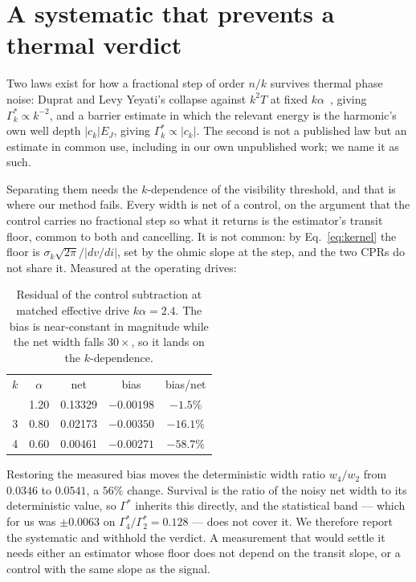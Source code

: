 \documentclass[aps,prb,twocolumn,superscriptaddress,floatfix,nofootinbib]{revtex4-2}
\begin{document}
\section{A systematic that prevents a thermal verdict}
\label{sec:thermal}

Two laws exist for how a fractional step of order $n/k$ survives thermal phase
noise: Duprat and Levy Yeyati's collapse against $k^2T$ at fixed
$k\alpha$~\cite{Duprat2005}, giving $\Gamma^*_k\propto k^{-2}$, and a barrier
estimate in which the relevant energy is the harmonic's own well depth
$|c_k|E_J$, giving $\Gamma^*_k\propto|c_k|$. The second is not a published law
but an estimate in common use, including in our own unpublished work; we name it
as such.

Separating them needs the $k$-dependence of the visibility threshold, and that
is where our method fails. Every width is net of a control, on the argument that
the control carries no fractional step so what it returns is the estimator's
transit floor, common to both and cancelling. It is not common: by
Eq.~\eqref{eq:kernel} the floor is $\sigma_k\sqrt{2\pi}/|dv/di|$, set by the
ohmic slope at the step, and the two CPRs do not share it. Measured at the
operating drives:

\begin{table}[b]
  \caption{Residual of the control subtraction at matched effective drive
  $k\alpha=2.4$. The bias is near-constant in magnitude while the net width falls
  $30\times$, so it lands on the $k$-dependence.}
  \label{tab:floor}
  \begin{ruledtabular}
  \begin{tabular}{ccccc}
    $k$ & $\alpha$ & net & bias & bias/net \\
    \colrule
    2 & 1.20 & 0.13329 & $-0.00198$ & $-1.5\%$ \\
    3 & 0.80 & 0.02173 & $-0.00350$ & $-16.1\%$ \\
    4 & 0.60 & 0.00461 & $-0.00271$ & $-58.7\%$ \\
  \end{tabular}
  \end{ruledtabular}
\end{table}

Restoring the measured bias moves the deterministic width ratio
$w_4/w_2$ from $0.0346$ to $0.0541$, a $56\%$ change. Survival is the ratio of
the noisy net width to its deterministic value, so $\Gamma^*$ inherits this
directly, and the statistical band --- which for us was $\pm0.0063$ on
$\Gamma^*_4/\Gamma^*_2=0.128$ --- does not cover it. We therefore report the
systematic and withhold the verdict. A measurement that would settle it needs
either an estimator whose floor does not depend on the transit slope, or a
control with the same slope as the signal.
\end{document}
